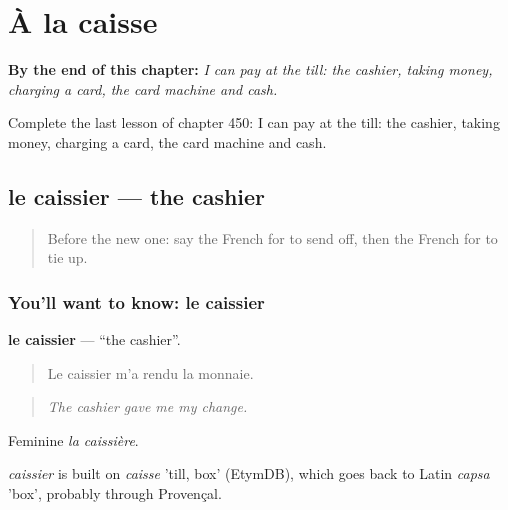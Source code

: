 
\chapter{À la caisse}
\label{ch:fr-a-la-caisse}

\begin{chapteropening}
\textbf{By the end of this chapter:} \emph{I can pay at the till: the cashier, taking money, charging a card, the card machine and cash.}

Complete the last lesson of chapter 450: I can pay at the till: the cashier, taking money, charging a card, the card machine and cash.
\end{chapteropening}

\section[le caissier]{le caissier — the cashier}

\label{lesson:FR-C450-caissier}



\begin{quote}
Before the new one: say the French for to send off, then the French for to tie up.
\end{quote}

\subsection*{You'll want to know: le caissier}
\textbf{le caissier} — \textquotedblleft{}the cashier\textquotedblright{}.

\begin{quote}
Le caissier m'a rendu la monnaie.
\end{quote}

\begin{quote}
\emph{The cashier gave me my change.}
\end{quote}

Feminine \emph{la caissière}.

\begin{cousinweb}
\emph{caissier} is built on \emph{caisse} 'till, box' (EtymDB), which goes back to Latin \emph{capsa} 'box', probably through Provençal.
\end{cousinweb}

